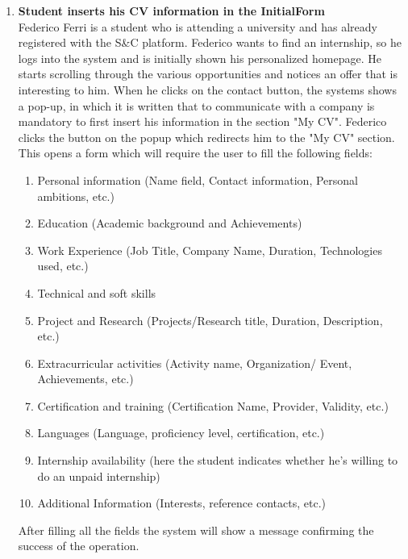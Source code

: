 \begin{enumerate}
      \item \textbf{Student inserts his CV information in the InitialForm}\\
      Federico Ferri is a student who is attending a university and has already registered with the S\&C platform.
      Federico wants to find an internship, so he logs into the system and is initially shown his personalized homepage. He starts scrolling through the various opportunities and notices an offer that is interesting to him. When he clicks on the contact button, the systems shows a pop-up, in which it is written that to communicate with a company is mandatory to first insert his information in the section "My CV".
      Federico clicks the button on the popup which redirects him to the "My CV" section. 
      This opens a form which will require the user to fill the following fields:
      \begin{enumerate}
		    \item Personal information (Name field, Contact information, Personal ambitions, etc.) 
		      \item Education (Academic background and Achievements)
                \item Work Experience (Job Title, Company Name, Duration, Technologies used, etc.)
            \item Technical and soft skills 
            \item Project and Research (Projects/Research title, Duration, Description, etc.)
            \item Extracurricular activities (Activity name, Organization/ Event, Achievements, etc.)
            \item Certification and training (Certification Name, Provider, Validity, etc.)
            \item Languages (Language, proficiency level, certification, etc.)
            \item Internship availability (here the student indicates whether he's willing to do an unpaid internship)
            \item Additional Information (Interests, reference contacts, etc.)
    \end{enumerate}
After filling all the fields the system will show a message confirming the success of the operation. 
     

\end{enumerate}
